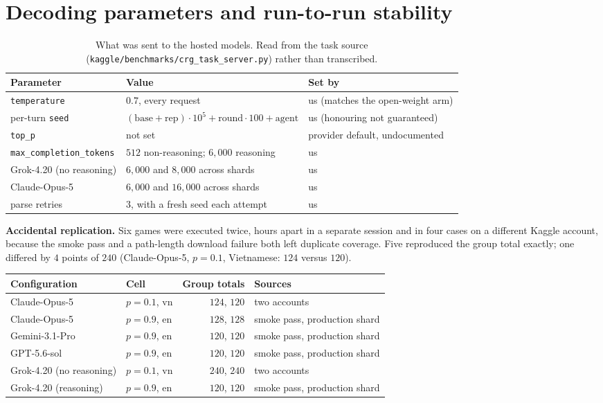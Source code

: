 \documentclass[11pt,a4paper]{article}
\begin{document}
\section{Decoding parameters and run-to-run stability}
\label{sec:decoding}

\begin{table}[h]
\centering
\caption{What was sent to the hosted models. Read from the task source
(\texttt{kaggle/benchmarks/crg\_task\_server.py}) rather than transcribed.}
\label{tab:esm-decoding}
\begin{tabular}{@{}lll@{}}
\toprule
Parameter & Value & Set by \\
\midrule
\texttt{temperature} & $0.7$, every request & us (matches the open-weight arm) \\
per-turn \texttt{seed} & $(\mathrm{base}+\mathrm{rep})\cdot10^5+\mathrm{round}\cdot100+\mathrm{agent}$ & us (honouring not guaranteed) \\
\texttt{top\_p} & not set & provider default, undocumented \\
\texttt{max\_completion\_tokens} & $512$ non-reasoning; $6{,}000$ reasoning & us \\
\quad Grok-4.20 (no reasoning) & $6{,}000$ and $8{,}000$ across shards & us \\
\quad Claude-Opus-5 & $6{,}000$ and $16{,}000$ across shards & us \\
parse retries & $3$, with a fresh seed each attempt & us \\
\bottomrule
\end{tabular}
\end{table}

\noindent \textbf{Accidental replication.} Six games were executed twice, hours apart in a
separate session and in four cases on a different Kaggle account, because the smoke pass
and a path-length download failure both left duplicate coverage. Five reproduced the
group total exactly; one differed by $4$ points of $240$ (Claude-Opus-5, $p=0.1$,
Vietnamese: $124$ versus $120$).

\begin{center}
\begin{tabular}{@{}llrl@{}}
\toprule
Configuration & Cell & Group totals & Sources \\
\midrule
Claude-Opus-5            & $p{=}0.1$, vn & $124$, $120$ & two accounts \\
Claude-Opus-5            & $p{=}0.9$, en & $128$, $128$ & smoke pass, production shard \\
Gemini-3.1-Pro           & $p{=}0.9$, en & $120$, $120$ & smoke pass, production shard \\
GPT-5.6-sol              & $p{=}0.9$, en & $120$, $120$ & smoke pass, production shard \\
Grok-4.20 (no reasoning) & $p{=}0.1$, vn & $240$, $240$ & two accounts \\
Grok-4.20 (reasoning)    & $p{=}0.9$, en & $120$, $120$ & smoke pass, production shard \\
\bottomrule
\end{tabular}
\end{center}
\end{document}
